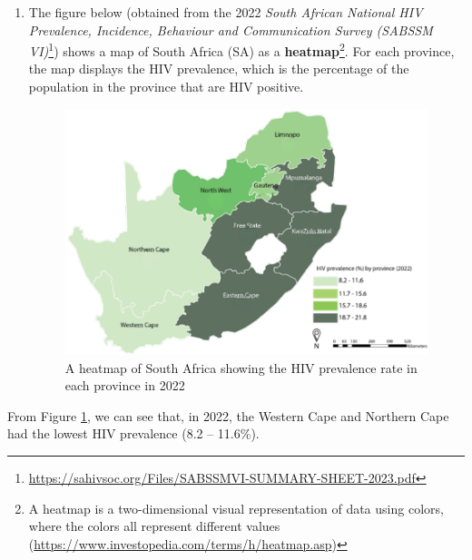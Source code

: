 \documentclass[
]{book}
\begin{document}
\begin{enumerate}
\def\labelenumi{\arabic{enumi}.}
\item
  The figure below (obtained from the 2022 \emph{South African National HIV Prevalence, Incidence, Behaviour and Communication Survey (SABSSM VI)}\footnote{\url{https://sahivsoc.org/Files/SABSSMVI-SUMMARY-SHEET-2023.pdf}}) shows a map of South Africa (SA) as a \textbf{heatmap}\footnote{A heatmap is a two-dimensional visual representation of data using colors, where the colors all represent different values (\url{https://www.investopedia.com/terms/h/heatmap.asp})}. For each province, the map displays the HIV prevalence, which is the percentage of the population in the province that are HIV positive.

  \begin{figure}
  \centering
  \includegraphics[width=5.20833in,height=\textheight]{images/HIV-Prevalence_2022.png}
  \caption{A heatmap of South Africa showing the HIV prevalence rate in each province in 2022}\label{fig1}
  \end{figure}
\end{enumerate}

From Figure \ref{fig1}, we can see that, in 2022, the Western Cape and Northern Cape had the lowest HIV prevalence (8.2 -- 11.6\%).
\end{document}
